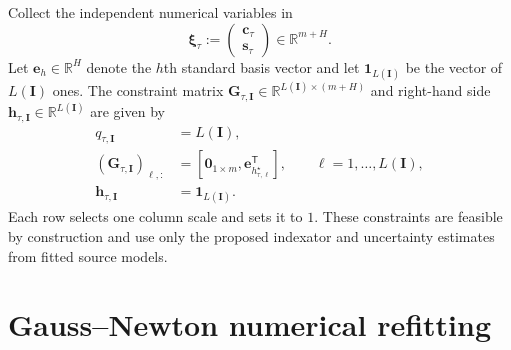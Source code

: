 Collect the independent numerical variables in
\begin{equation*}
    \boldsymbol\xi_\tau
        :=\begin{pmatrix}\mathbf c_\tau\\\mathbf s_\tau\end{pmatrix}
        \in\mathbb R^{m+H}.
\end{equation*}
Let $\mathbf e_h\in\mathbb R^H$ denote the
$h$th standard basis vector and let $\mathbf1_{L(\mathbf I)}$ be
the vector of $L(\mathbf I)$ ones. The constraint matrix
$\mathbf G_{\tau,\mathbf I}\in
\mathbb R^{L(\mathbf I)\times(m+H)}$ and right-hand side
$\mathbf h_{\tau,\mathbf I}\in\mathbb R^{L(\mathbf I)}$ are given by
\begin{equation}
    \begin{aligned}
        q_{\tau,\mathbf I}&=L(\mathbf I),\\
        (\mathbf G_{\tau,\mathbf I})_{\ell,:}
            &=\left[\mathbf0_{1\times m},
                \mathbf e_{h_{\tau,\ell}^{\star}}^{\mathsf T}\right],
            \qquad \ell=1,\ldots,L(\mathbf I),\\
        \mathbf h_{\tau,\mathbf I}&=\mathbf1_{L(\mathbf I)}.
    \end{aligned}
    \label{eq:appendix-relu-constraints}
\end{equation}
Each row selects one column scale and sets it to $1$. These constraints
are feasible by construction and use only the proposed indexator and
uncertainty estimates from fitted source models.

\section{Gauss--Newton numerical refitting}
\label{app:gauss-newton}

